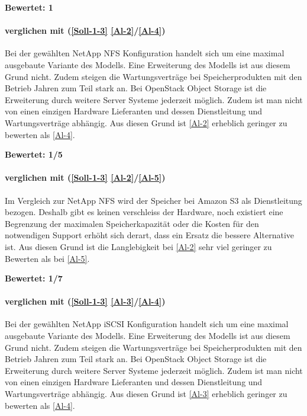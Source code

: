 \textbf{Bewertet: 1}

\paragraph*{  verglichen mit  (\ref{Soll-1-3} \ref{Al-2}/\ref{Al-4})}
Bei der gewählten NetApp NFS Konfiguration handelt sich um eine maximal ausgebaute Variante des Modells. Eine Erweiterung des Modells ist aus diesem Grund nicht. Zudem steigen die Wartungsverträge bei Speicherprodukten mit den Betrieb Jahren zum Teil stark an. Bei OpenStack Object Storage ist die Erweiterung durch weitere Server Systeme jederzeit möglich. Zudem ist man nicht von einen einzigen Hardware Lieferanten und dessen Dienstleitung und Wartungsverträge abhängig. Aus diesen Grund ist  \ref{Al-2} erheblich geringer zu bewerten als  \ref{Al-4}.

\textbf{Bewertet: 1/5}

\paragraph*{  verglichen mit  (\ref{Soll-1-3} \ref{Al-2}/\ref{Al-5})}
Im Vergleich zur NetApp NFS wird der Speicher bei Amazon S3 als Dienstleitung bezogen. Deshalb gibt es keinen verschleiss der Hardware, noch existiert eine Begrenzung der maximalen Speicherkapazität oder die Kosten für den notwendigen Support erhöht sich derart, dass ein Ersatz die bessere Alternative ist.
Aus diesen Grund ist die Langlebigkeit bei  \ref{Al-2} sehr viel geringer zu Bewerten als bei  \ref{Al-5}.

\textbf{Bewertet: 1/7}

\paragraph*{  verglichen mit  (\ref{Soll-1-3} \ref{Al-3}/\ref{Al-4})}
Bei der gewählten NetApp iSCSI Konfiguration handelt sich um eine maximal ausgebaute Variante des Modells. Eine Erweiterung des Modells ist aus diesem Grund nicht. Zudem steigen die Wartungsverträge bei Speicherprodukten mit den Betrieb Jahren zum Teil stark an. Bei OpenStack Object Storage ist die Erweiterung durch weitere Server Systeme jederzeit möglich. Zudem ist man nicht von einen einzigen Hardware Lieferanten und dessen Dienstleitung und Wartungsverträge abhängig. Aus diesen Grund ist  \ref{Al-3} erheblich geringer zu bewerten als  \ref{Al-4}.

